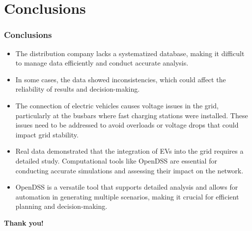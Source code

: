 \documentclass[10pt, aspectratio=1610]{beamer}
\begin{document}
\section{Conclusions}

\begin{frame}
    \frametitle{Conclusions}

    \begin{itemize}%
        \item The distribution company lacks a systematized database, 
        making it difficult to manage data efficiently and conduct 
        accurate analysis.

        \item In some cases, the data showed inconsistencies, which 
        could affect the reliability of results and decision-making.

        \item The connection of electric vehicles causes voltage issues 
        in the grid, particularly at the busbars where fast charging 
        stations were installed. These issues need to be addressed to avoid 
        overloads or voltage drops that could impact grid stability.

        \item Real data demonstrated that the integration of EVs 
        into the grid requires a detailed study. Computational 
        tools like OpenDSS are essential for conducting accurate simulations 
        and assessing their impact on the network.

        \item OpenDSS is a versatile tool that supports detailed analysis 
        and allows for automation in generating multiple scenarios, making 
        it crucial for efficient planning and decision-making.


    \end{itemize}
\end{frame}


\begin{frame}
    \textbf{Thank you!}
\end{frame}
\end{document}
